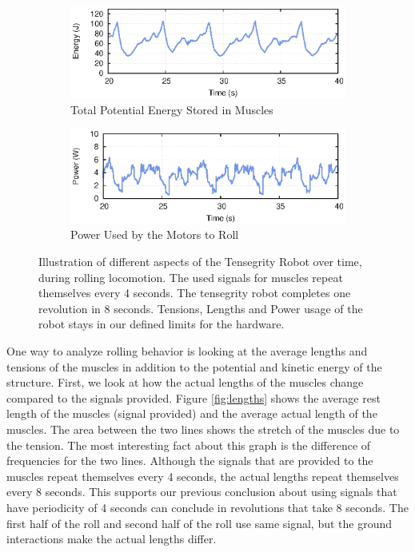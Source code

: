 \documentclass[twocolumn,10pt]{asme2ej}
\begin{document}
\begin{figure}
         \begin{subfigure}[b]{0.9\columnwidth}
         		\includegraphics[width=\textwidth]{results/tension-energy/tensPotEnergy.eps}
                \caption{Total Potential Energy Stored in Muscles}
                \label{fig:PotEnergy}
        \end{subfigure}
        \begin{subfigure}[b]{0.9\columnwidth}
         		\includegraphics[width=\textwidth]{results/tension-energy/power.eps}
                \caption{Power Used by the Motors to Roll}
                \label{fig:power}
        \end{subfigure}
        \caption{Illustration of different aspects of the Tensegrity Robot over time, during rolling locomotion. The used signals for muscles repeat themselves every 4 seconds. The tensegrity robot completes one revolution in 8 seconds. Tensions, Lengths and Power usage of the robot stays in our defined limits for the hardware. }
        \label{fig:RollingAnalyze}
\end{figure}


One way to analyze rolling behavior is looking at the average lengths and tensions of the muscles in addition to the potential and kinetic energy of the structure. First, we look at how the actual lengths of the muscles change compared to the signals provided. Figure \ref{fig:lengths} shows the average rest length of the muscles (signal provided) and the average actual length of the muscles. The area between the two lines shows the stretch of the muscles due to the tension. The most interesting fact about this graph is the difference of frequencies for the two lines. Although the signals that are provided to the muscles repeat themselves every 4 seconds, the actual lengths repeat themselves every 8 seconds. This supports our previous conclusion about using signals that have periodicity of 4 seconds can conclude in revolutions that take 8 seconds. The first half of the roll and second half of the roll use same signal, but the ground interactions make the actual lengths differ.
\end{document}
